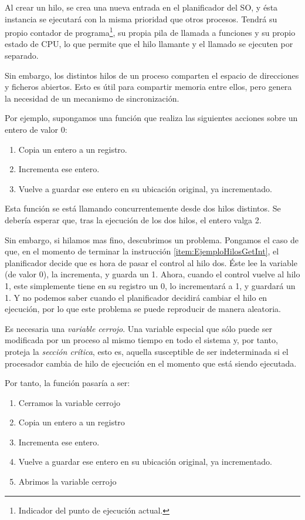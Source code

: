 Al crear un hilo, se crea una nueva entrada en el planificador del \gls{SO}, y ésta instancia se 
ejecutará con la misma prioridad que otros procesos. Tendrá su propio contador de programa\footnote{Indicador del punto 
de ejecución actual.}, su propia pila de llamada a funciones y su propio estado de CPU, lo que permite que el hilo 
llamante y el llamado se ejecuten por separado.

Sin embargo, los distintos hilos de un proceso comparten el espacio de direcciones y ficheros abiertos. Esto es útil 
para compartir memoria entre ellos, pero genera la necesidad de un mecanismo de sincronización.

Por ejemplo, supongamos una función que realiza las siguientes acciones sobre un entero de valor 0:
\begin{enumerate}
 \item Copia un entero a un registro\label{item:EjemploHilosGetInt}.
 \item Incrementa ese entero.
 \item Vuelve a guardar ese entero en su ubicación original, ya incrementado.
\end{enumerate}

Esta función se está llamando concurrentemente desde dos hilos distintos. Se debería esperar que, tras la ejecución de 
los dos hilos, el entero valga 2.

Sin embargo, si hilamos mas fino, descubrimos un problema. Pongamos el caso de que, en el momento de terminar la 
instrucción \ref{item:EjemploHilosGetInt}, el planificador decide que es hora de pasar el control al hilo dos. 
Éste lee la variable (de valor 0), la incrementa, y guarda un 1. Ahora, cuando el control vuelve al hilo 1, este 
simplemente tiene en su registro un 0, lo incrementará a 1, y guardará un 1. Y no podemos saber cuando el planificador 
decidirá cambiar el hilo en ejecución, por lo que este problema se puede reproducir de manera aleatoria.

Es necesaria una \emph{variable cerrojo}. Una variable especial que sólo puede ser 
modificada por un proceso al mismo tiempo en todo el sistema y, por tanto, proteja la \emph{sección 
crítica}, esto es, aquella susceptible de ser indeterminada si el procesador cambia de hilo de 
ejecución en el momento que está siendo ejecutada.

Por tanto, la función pasaría a ser:
\begin{enumerate}
 \item Cerramos la variable cerrojo
 \item Copia un entero a un registro
 \item Incrementa ese entero.
 \item Vuelve a guardar ese entero en su ubicación original, ya incrementado.
 \item Abrimos la variable cerrojo
\end{enumerate}

